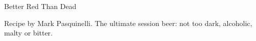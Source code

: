\begin{recipe}{Better Red Than Dead} %

\begin{aboutblock}
Recipe by Mark Pasquinelli. The ultimate session beer: not too dark, alcoholic,
malty or bitter.  
\end{aboutblock}


\begin{methodandtiming}

\begin{mashsteps}
\end{mashsteps}

\begin{fermentationsteps}
\end{fermentationsteps}

\end{methodandtiming}

\recipebreak

\begin{ingredientsblock}

\begin{malts}
\end{malts}

\begin{hops}
\end{hops}


\end{ingredientsblock}

\end{recipe}


